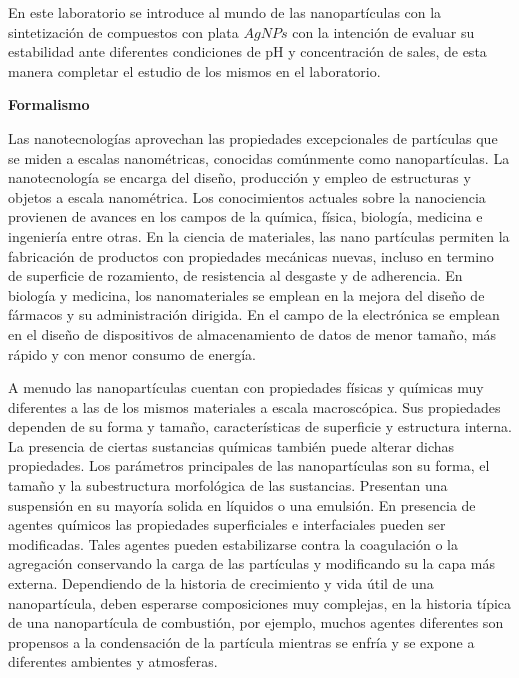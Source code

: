 En este laboratorio se introduce al mundo de las nanopartículas con la sintetización de compuestos con plata $AgNPs$ con la intención de evaluar su estabilidad ante diferentes condiciones de pH y concentración de sales, de esta manera completar el estudio de los mismos en el laboratorio.

\textbf{\textcolor{azul50}{Formalismo}}

Las nanotecnologías aprovechan las propiedades excepcionales de partículas que se miden a escalas nanométricas, conocidas comúnmente como nanopartículas.  La nanotecnología se encarga del diseño, producción y empleo de estructuras y objetos a escala nanométrica. Los conocimientos actuales sobre la nanociencia provienen de avances en los campos de la química, física, biología, medicina e ingeniería entre otras. En la ciencia de materiales, las nano partículas permiten la fabricación de productos con propiedades mecánicas nuevas, incluso en termino de superficie de rozamiento, de resistencia al desgaste y de adherencia. En biología y medicina, los nanomateriales se emplean en la mejora del diseño de fármacos y su administración dirigida. En el campo de la electrónica se emplean en el diseño de dispositivos de almacenamiento de datos de menor tamaño, más rápido y con menor consumo de energía. 

A menudo las nanopartículas cuentan con propiedades físicas y químicas muy diferentes a las de los mismos materiales a escala macroscópica. Sus propiedades dependen de su forma y tamaño, características de superficie y estructura interna. La presencia de ciertas sustancias químicas también puede alterar dichas propiedades. Los parámetros principales de las nanopartículas son su forma, el tamaño y la subestructura morfológica de las sustancias. Presentan una suspensión en su mayoría solida en líquidos o una emulsión. En presencia de agentes químicos las propiedades superficiales e interfaciales pueden ser modificadas. Tales agentes pueden estabilizarse contra la coagulación o la agregación conservando la carga de las partículas y modificando su la capa más externa. Dependiendo de la historia de crecimiento y vida útil de una nanopartícula, deben esperarse composiciones muy complejas, en la historia típica de una nanopartícula de combustión, por ejemplo, muchos agentes diferentes son propensos a la condensación de la partícula mientras se enfría y se expone a diferentes ambientes y atmosferas. 

